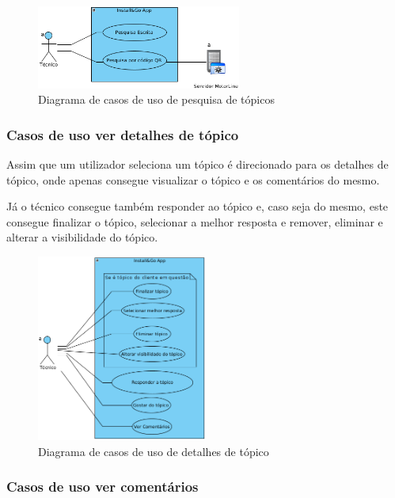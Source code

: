 \begin{figure}[htb]
    \centering
    \includegraphics[width=0.6\textwidth]{images/diagramas/casos_de_uso/use_case_forum_search.png}
    \caption{Diagrama de casos de uso de pesquisa de tópicos}
    \label{fig:13}
\end{figure}

\subsubsection{Casos de uso ver detalhes de tópico}

Assim que um utilizador seleciona um tópico é direcionado para os 
detalhes de tópico, onde apenas consegue visualizar o tópico e os comentários do mesmo.

Já o técnico consegue também responder ao tópico e, caso seja do mesmo, este consegue finalizar 
o tópico, selecionar a melhor resposta e remover, eliminar e alterar a visibilidade do tópico.

\begin{figure}[htb]
    \centering
    
    \includegraphics[width=0.5\textwidth]{images/diagramas/casos_de_uso/use_case_topic_details.png}
    \caption{Diagrama de casos de uso de detalhes de tópico}
    \label{fig:14}
\end{figure}

\subsubsection{Casos de uso ver comentários}

